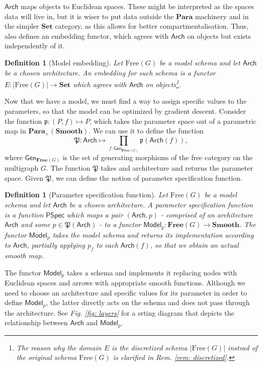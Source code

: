 \documentclass[11pt,a4paper,openright,twoside]{report}
\newcounter{mycounter}
\theoremstyle{plain}
\newtheorem{definition}[mycounter]{Definition}
\theoremstyle{definition}
\begin{document}
$\mathsf{Arch}$ maps objects to Euclidean spaces. These might be interpreted as the spaces data will live in, but it is wiser to put data outside the $\mathbf{Para}$ machinery and in the simpler $\mathbf{Set}$ category, as this allows for better compartmentalisation. Thus, \cite{gavranovic2019compositional} also defines an embedding functor, which agrees with $\mathsf{Arch}$ on objects but exists independently of it.

\begin{definition}[Model embedding]
  Let $\mathrm{Free}(G)$ be a model schema and let $\mathsf{Arch}$ be a chosen architecture. An embedding for such schema is a functor $E: |\mathrm{Free}(G)| \to \mathbf{Set}$ which agrees with $\mathsf{Arch}$ on objects\footnote{The reason why the domain $E$ is the discretized schema $|\mathrm{Free}(G)|$ instead of the original schema $\mathrm{Free}(G)$ is clarified in \textit{Rem. \ref{rem: discretized}}.}.
\end{definition}

Now that we have a model, we must find a way to assign specific values to the parameters, so that the model can be optimized by gradient descent. Consider the function $\mathfrak{p}: (P,f) \mapsto P$, which takes the parameter space out of a parametric map in $\mathbf{Para}_{\times}(\mathbf{Smooth})$. We can use it to define the function 
\[\mathfrak{P}: \mathsf{Arch} \mapsto \prod_{f : \mathsf{Gen}_{\mathbf{Free}(G)}}\mathfrak{p}(\mathsf{Arch}(f)),\]
where $\mathsf{Gen}_{\mathbf{Free}(G)}$ is the set of generating morphisms of the free category on the multigraph $G$. The function $\mathfrak{P}$ takes and architecture and returns the parameter space. Given $\mathfrak{P}$, we can define the notion of parameter specification function.

\begin{definition}[Parameter specification function]
  Let $\mathrm{Free}(G)$ be a model schema and let $\mathsf{Arch}$ be a chosen architecture. A parameter specification function is a function $\mathsf{PSpec}$ which maps a pair $(\mathsf{Arch}, p)$ - comprised of an architecture $\mathsf{Arch}$ and some $p \in \mathfrak{P}(\mathsf{Arch})$ - to a functor $\mathsf{Model}_p: \mathbf{Free}(G) \to \mathbf{Smooth}$. The functor $\mathsf{Model}_p$ takes the model schema and returns its implementation according to $\mathsf{Arch}$, partially applying $p_f$ to each $\mathsf{Arch}(f)$, so that we obtain an actual smooth map. 
\end{definition}

The functor $\mathsf{Model}_p$ takes a schema and implements it replacing nodes with Euclidean spaces and arrows with appropriate smooth functions. Although we need to choose an architecture and specific values for its parameter in order to define $\mathsf{Model}_p$, the latter directly acts on the schema and does not pass through the architecture. See \textit{Fig. \ref{fig: layers}} for a srting diagram that depicts the relationship between $\mathsf{Arch}$ and $\mathsf{Model}_p$.
\end{document}
